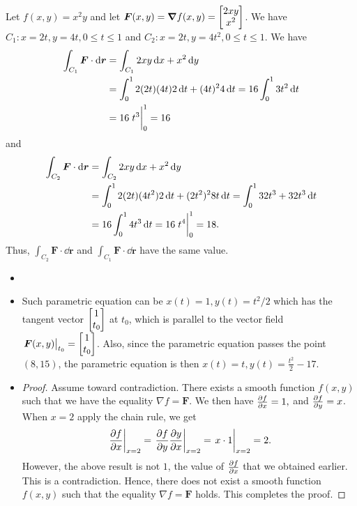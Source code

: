 \documentclass[8pt,twocolumn]{article}
\begin{document}
\begin{Answer}[number=30]
  Let $f(x,y)=x^2y$ and let $\bm{F}(x,y)=\grad f(x,y) = \mqty[2xy\\ x^2]$. We
  have $C_1: x=2t, y=4t, 0\le t\le 1$ and $C_2: x=2t, y=4t^2, 0\le t\le 1$. We
  have
  \begin{align*}
    \int_{C_1} \bm{F}\cdot \dd{\bm{r}} &= \int_{C_1} 2xy \dd{x} + x^2\dd{y} \\
    &= \int_0^1 2(2t)(4t) 2\dd{t} + (4t)^2 4\dd{t} = 16\int_0^1 3t^2\dd{t} \\
    &=16 \eval{t^3}_0^1 = 16
  \end{align*}
  and
  \begin{align*}
    \int_{C_2} \bm{F}\cdot \dd{\bm{r}} &= \int_{C_2} 2xy \dd{x} + x^2\dd{y} \\
    &= \int_0^1 2(2t)(4t^2) 2\dd{t} + (2t^2)^2 8t\dd{t} = \int_0^1 32t^3 + 32t^3\dd{t} \\
    &= 16\int_0^1 4t^3 \dd{t} = 16 \eval{t^4}_0^1 = 18.
  \end{align*}
  Thus, \(\int_{C_2} \bm{F}\cdot \dd{\bm{r}}\) and \(\int_{C_1} \bm{F}\cdot
  \dd{\bm{r}}\) have the same value.
\end{Answer}

\begin{Answer}[number=31]
  \begin{itemize}
    \item
      
      \item
        Such parametric equation can be $x(t) = 1, y(t)=t^2/2$ which has the
        tangent vector $\mqty[1\\ t_0]$ at $t_0$, which is parallel to the
        vector field $\eval{\bm{F}(x,y)}_{t_0}=\mqty[1\\t_0]$. Also, since the
        parametric equation passes the point $(8,15)$, the parametric equation
        is then $x(t)=t, y(t)=\frac{t^2}{2}-17$.
    \item
      \begin{proof}
        Assume toward contradiction. There exists a smooth function $f(x,y)$
        such that we have the equality $\nabla f=\bm{F}$. We then have
        $\pdv{f}{x}=1,$ and $\pdv{f}{y}=x$. When $x=2$ apply the chain rule, we get
        \[
          \eval{\pdv{f}{x}}_{x=2} = \eval{\pdv{f}{y}\pdv{y}{x}}_{x=2} =
          \eval{x\cdot 1}_{x=2} = 2.
        \]
        However, the above result is not $1$, the value of $\pdv{f}{x}$ that we
        obtained earlier. This is a contradiction. Hence, there does not exist
        a smooth function $f(x,y)$ such that the equality $\nabla f=\bm{F}$
        holds. This completes the proof.
      \end{proof}
  \end{itemize}
\end{Answer}
\end{document}
